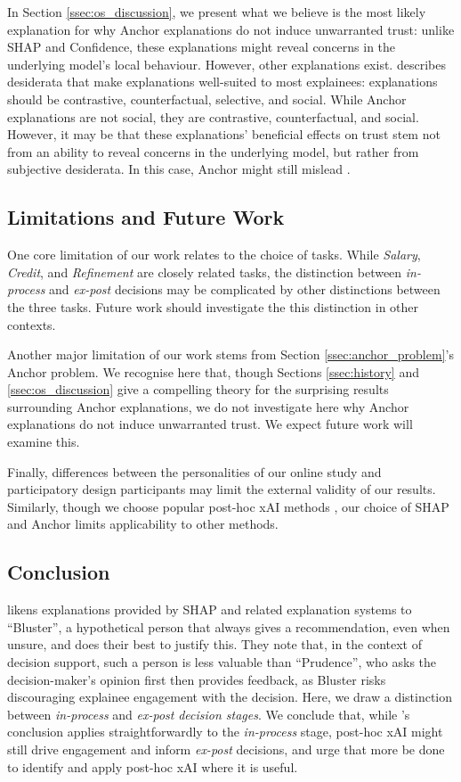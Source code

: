 In Section \ref{ssec:os_discussion}, we present what we believe is the most likely explanation for why Anchor explanations do not induce unwarranted trust: unlike SHAP and Confidence, these explanations might reveal concerns in the underlying model's local behaviour. However, other explanations exist. \textcite{miller_explanation_2017} describes desiderata that make explanations well-suited to most explainees: explanations should be contrastive, counterfactual, selective, and social. While Anchor explanations are not social, they are contrastive, counterfactual, and social. However, it may be that these explanations' beneficial effects on trust stem not from an ability to reveal concerns in the underlying model, but rather from subjective desiderata. In this case, Anchor might still mislead \cite{Lipton}.

\subsection{Limitations and Future Work}
One core limitation of our work relates to the choice of tasks. While \emph{Salary}, \emph{Credit}, and \emph{Refinement} are closely related tasks, the distinction between \emph{in-process} and \emph{ex-post} decisions may be complicated by other distinctions between the three tasks. Future work should investigate the this distinction in other contexts.

Another major limitation of our work stems from Section \ref{ssec:anchor_problem}'s Anchor problem. We recognise here that, though Sections \ref{ssec:history} and \ref{ssec:os_discussion} give a compelling theory for the surprising results surrounding Anchor explanations, we do not investigate here why Anchor explanations do not induce unwarranted trust. We expect future work will examine this.

Finally, differences between the personalities of our online study and participatory design participants may limit the external validity of our results. Similarly, though we choose popular post-hoc xAI methods \cite{barocas_hidden_2020,kumar_problems_2020,weerts_human-grounded_2019,ribeiro_nothing_2016}, our choice of SHAP and Anchor limits applicability to other methods.

\subsection{Conclusion}
\textcite{miller_explainable_2023} likens explanations provided by SHAP and related explanation systems to ``Bluster'', a hypothetical person that always gives a recommendation, even when unsure, and does their best to justify this. They note that, in the context of decision support, such a person is less valuable than ``Prudence'', who asks the decision-maker's opinion first then provides feedback, as Bluster risks discouraging explainee engagement with the decision. Here, we draw a distinction between \emph{in-process} and \emph{ex-post} \emph{decision stages}. We conclude that, while \textcite{miller_explainable_2023}'s conclusion applies straightforwardly to the \emph{in-process} stage, post-hoc xAI might still drive engagement and inform \emph{ex-post} decisions, and urge that more be done to identify and apply post-hoc xAI where it is useful.
